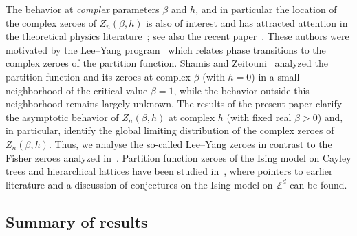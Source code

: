 \documentclass[AHL,Unicode,longabstracts,published]{cedram}
\newcommand{\Z}{\mathbb{Z}}
\begin{document}
The behavior at \emph{complex} parameters $\beta$ and $h$, and in particular the location of the complex zeroes of $Z_n(\beta, h)$ is also of interest and has attracted attention in the theoretical physics literature~\cite{deger_brange_flindt,
deger_flindt,glasser_etal,Krasnytska}; see also the recent paper~\cite{newman_motion_yee_yang}. These authors were motivated by the Lee--Yang program~\cite{fisher,lee_yangII,lee_yangI} which relates phase transitions to the complex zeroes of the partition function. Shamis and Zeitouni~\cite{shamis_zeitouni} analyzed the partition function and its zeroes at complex $\beta$ (with $h=0$) in a small neighborhood of the critical value $\beta = 1$, while the behavior outside this neighborhood remains largely unknown. The results of the present paper clarify the asymptotic behavior of $Z_n(\beta, h)$ at complex $h$ (with fixed real $\beta>0$) and, in particular, identify the global limiting distribution of the complex zeroes of $Z_n(\beta, h)$. Thus, we analyse the so-called Lee--Yang zeroes in contrast to the Fisher zeroes analyzed in~\cite{shamis_zeitouni}. Partition function zeroes of the Ising model on Cayley trees and hierarchical lattices have been studied in~\cite{bleher_etal_I,bleher_etal_II,chio_etal}, where pointers to earlier literature and a discussion of conjectures on the Ising model on $\Z^d$ can be found.


\subsection{Summary of results} 
\end{document}
